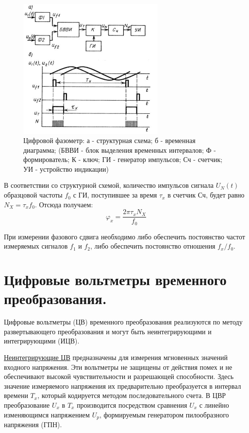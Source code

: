 \documentclass[unicode, 12pt, a4paper, oneside]{article}
\begin{document}
\begin{figure}[H]
\centering
\includegraphics[width=0.65\textwidth]{54.jpg}
\caption{Цифровой фазометр: а - структурная схема; б - временная диаграмма; (БВВИ - блок выделения временных интервалов; Ф - формирователь; К - ключ; ГИ - генератор импульсов; Сч - счетчик; УИ - устройство индикации)}
\end{figure}

В соответствии со структурной схемой, количество импульсов сигнала $U_N (t)$ образцовой частоты $f_0$ с ГИ, поступившее за время $\tau_x$ в счетчик Сч, будет равно $N_X = \tau_x f_0$. Отсюда получаем:
\begin{displaymath}
\varphi_x = \frac{2\pi \tau_x N_X}{f_0}
\end{displaymath}

При измерении фазового сдвига необходимо либо обеспечить постоянство частот измеряемых сигналов $f_1$ и $f_2$, либо обеспечить постоянство отношения $f_x/f_0$.

\section{Цифровые вольтметры временного преобразования.}

Цифровые вольтметры (ЦВ) временного преобразования реализуются по методу развертывающего преобразования и могут быть неинтегрирующими и интегрирующими (ИЦВ).

\underline{Неинтегрирующие ЦВ} предназначены для измерения мгновенных значений входного напряжения. Эти вольтметры не защищены от действия помех и не обеспечивают высокой чувствительности и разрешающей способности. Здесь значение измеряемого напряжения их предварительно преобразуется в интервал времени $T_x$, который кодируется методом последовательного счета. В ЦВР преобразование $U_x$ в $T_x$ производится посредством сравнения $U_x$ с линейно изменяющимся напряжением $U_p$, формируемым генератором пилообразного напряжения (ГПН).
\end{document}
